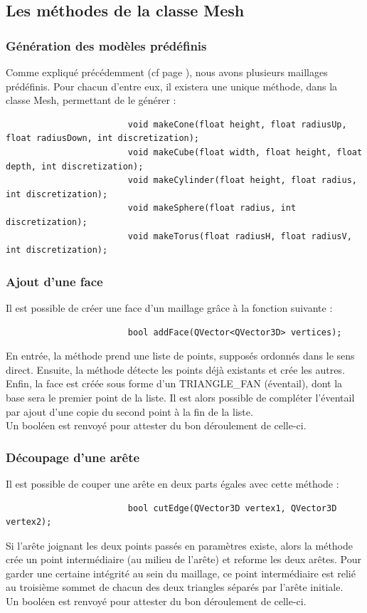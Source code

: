 \documentclass[a4paper]{memoir}
\begin{document}
			\subsection{Les méthodes de la classe Mesh}
				\label{mesh-dev}
				\subsubsection{Génération des modèles prédéfinis}
					Comme expliqué précédemment (cf page \pageref{model-cdc}), nous avons plusieurs maillages prédéfinis. Pour chacun d'entre eux, 
					il existera une unique méthode, dans la classe Mesh, permettant de le générer :
					\begin{verbatim}
						void makeCone(float height, float radiusUp, float radiusDown, int discretization);
						void makeCube(float width, float height, float depth, int discretization);
						void makeCylinder(float height, float radius, int discretization);
						void makeSphere(float radius, int discretization);
						void makeTorus(float radiusH, float radiusV, int discretization);
					\end{verbatim}
					
				\subsubsection{Ajout d'une face}
					Il est possible de créer une face d'un maillage grâce à la fonction suivante :
					\begin{verbatim}
						bool addFace(QVector<QVector3D> vertices);
					\end{verbatim}
					En entrée, la méthode prend une liste de points, supposés ordonnés dans le sens direct. Ensuite, la méthode détecte les points déjà 
					existants et crée les autres. Enfin, la face est créée sous forme d'un TRIANGLE\_FAN (éventail), dont la base sera le premier point 
					de la liste. Il est alors possible de compléter l'éventail par ajout d'une copie du second point à la fin de la liste.\\
					Un booléen est renvoyé pour attester du bon déroulement de celle-ci.
					
				\subsubsection{Découpage d'une arête}
					Il est possible de couper une arête en deux parts égales avec cette méthode :
					\begin{verbatim}
						bool cutEdge(QVector3D vertex1, QVector3D vertex2);
					\end{verbatim}
					Si l'arête joignant les deux points passés en paramètres existe, alors la méthode crée un point intermédiaire (au milieu de l'arête) et
					reforme les deux arêtes. Pour garder une certaine intégrité au sein du maillage, ce point intermédiaire est relié au troisième sommet 
					de chacun des deux triangles séparés par l'arête initiale.\\
					Un booléen est renvoyé pour attester du bon déroulement de celle-ci.
					
\end{document}
